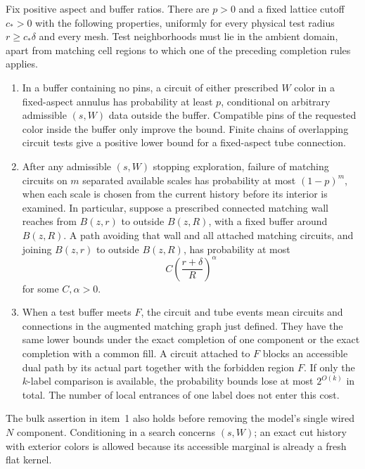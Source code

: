 \begin{proposition}
\label{prop:circuits}
Fix positive aspect and buffer ratios. There are $p>0$ and a fixed
lattice cutoff $c_*>0$ with the following properties, uniformly for
every physical test radius $r\ge c_*\delta$ and every mesh. Test
neighborhoods must lie in the ambient domain, apart from matching
cell regions to which one of the preceding completion rules applies.
\begin{enumerate}
\item In a buffer containing no pins, a circuit of either prescribed
$W$ color in a fixed-aspect annulus has probability at least $p$,
conditional on arbitrary admissible $(s,W)$ data outside the buffer.
Compatible pins of the requested color inside the buffer only improve
the bound. Finite chains of overlapping circuit tests give a positive
lower bound for a fixed-aspect tube connection.
\item After any admissible $(s,W)$ stopping exploration, failure of
matching circuits on $m$ separated available scales has probability
at most $(1-p)^m$, when each scale is chosen from the current history
before its interior is examined. In particular, suppose a prescribed
connected
matching wall reaches from $B(z,r)$ to outside $B(z,R)$, with a fixed
buffer around $B(z,R)$. A path avoiding that wall and all attached
matching circuits, and joining $B(z,r)$ to outside $B(z,R)$, has
probability at most
\begin{equation}\label{eq:spatial-attached-arm}
       C\left(\frac{r+\delta}{R}\right)^\alpha
\end{equation}
for some $C,\alpha>0$.
\item When a test buffer meets $F$, the circuit and tube events mean
circuits and connections in the augmented matching graph just defined.
They have the same lower bounds under the exact completion of one
component or the exact completion with a common fill. A circuit
attached to $F$ blocks an accessible dual path by its actual part
together with the forbidden region $F$.
If only the $k$-label comparison is available, the probability bounds
lose at most $2^{O(k)}$ in total. The number of local entrances of one
label does not enter this cost.
\end{enumerate}
The bulk assertion in item~1 also holds before removing the model's
single wired $N$ component. Conditioning in a search concerns $(s,W)$;
an exact cut history with exterior colors is allowed because its
accessible marginal is already a fresh flat kernel.
\end{proposition}

